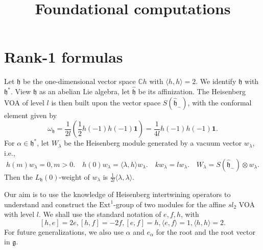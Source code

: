 \documentclass{article}
\theoremstyle{definition}
\newcommand{\C}{{\mathbb C}}
\newcommand{\h}{{\mathfrak h}}
\newcommand{\g}{{\mathfrak g}}
\newcommand{\one}{\mathbf{1}}
\begin{document}
\setlength{\oddsidemargin}{0cm} \setlength{\evensidemargin}{0cm}
\baselineskip=18pt


\title{Foundational computations}


\maketitle

\section{Rank-1 formulas}

Let $\mathfrak{h}$ be the one-dimensional vector space $\C h$ with $\langle h, h\rangle = 2$. We identify $\mathfrak{h}$ with $\mathfrak{h}^*$. View $\mathfrak{h}$ as an abelian Lie algebra, let $\hat{\mathfrak{h}}$ be its affinization. The Heisenberg VOA of level $l$ is then built upon the vector space $S(\hat\h_-)$, with the conformal element given by 
$$\omega_\h = \frac 1 {2l} \left(\frac 1 2 h(-1)h(-1)\one
\right) = \frac 1 {4l} h(-1)h(-1)\one.$$
For $\alpha\in \h^*$, let $W_\lambda$ be the Heisenberg module generated by a  vacuum vector $w_\lambda$, i.e., 
$$h(m)w_\lambda =0, m>0. \quad h(0) w_\lambda = \langle \lambda, h\rangle w_\lambda. \quad k w_\lambda = l w_\lambda. \quad W_\lambda = S(\hat\h_-)\otimes w_\lambda. $$
Then the $L_\h(0)$-weight of $w_\lambda$ is $\frac 1 {2l}\langle \lambda, \lambda\rangle.$

Our aim is to use the knowledge of Heisenberg intertwining operators to understand and construct the $\text{Ext}^1$-group of two modules for the affine $sl_2$ VOA with level $l$. We shall use the standard notation of $e,f,h$, with 
$$[h,e]=2e,[h,f]=-2f,[e,f]=h,\langle e,f\rangle = 1, \langle h, h\rangle = 2. $$
For future generalizations, we also use $\alpha$ and $e_\alpha$ for the root and the root vector in $\g$. 
\end{document}
